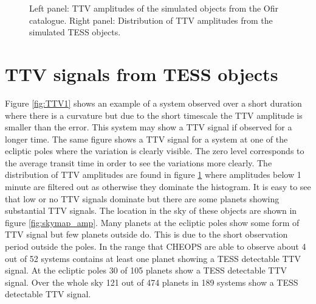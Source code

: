 \documentclass[12pt]{report}
\begin{document}
\begin{figure}
\begin{minipage}{.5\textwidth}
\end{minipage}
\caption{Left panel: TTV amplitudes of the simulated objects from the Ofir catalogue. Right panel: Distribution of TTV amplitudes from the simulated TESS objects.}
\label{fig:ampl_ofir}
\end{figure}


\section{TTV signals from TESS objects}
	Figure \ref{fig:TTV1} shows an example of a system observed over a short duration where there is a curvature but due to the short timescale the TTV amplitude is smaller than the error. This system may show a TTV signal if observed for a longer time. The same figure shows a TTV signal for a system at one of the ecliptic poles where the variation is clearly visible. The zero level corresponds to the average transit time in order to see the variations more clearly. The distribution of TTV amplitudes are found in figure \ref{fig:ampl_ofir} where amplitudes below 1 minute are filtered out as otherwise they dominate the histogram. It is easy to see that low or no TTV signals dominate but there are some planets showing substantial TTV signals. The location in the sky of these objects are shown in figure \ref{fig:skymap_amp}. Many planets at the ecliptic poles show some form of TTV signal but few planets outside do. This is due to the short observation period outside the poles. In the range that CHEOPS are able to observe about 4 out of 52 systems contains at least one planet showing a TESS detectable TTV signal. At the ecliptic poles 30 of 105 planets show a TESS detectable TTV signal. Over the whole sky 121 out of 474 planets in 189 systems show a TESS detectable TTV signal. 
	
\end{document}
